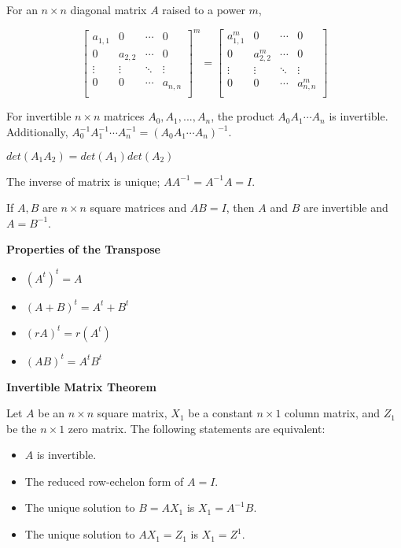 For an $n \times n$ diagonal matrix $A$ raised to a power $m$,

$$
\begin{bmatrix}
a_{1,1} & 0       & \cdots & 0     \\
0       & a_{2,2} & \cdots & 0     \\
\vdots  & \vdots  & \ddots & \vdots\\
0       & 0       & \cdots & a_{n,n}\\
\end{bmatrix}^{m}
=
\begin{bmatrix}
a_{1,1}^{m} & 0         & \cdots & 0        \\
0           & a_{2,2}^m & \cdots & 0        \\
\vdots      & \vdots    & \ddots & \vdots   \\
0           & 0         & \cdots & a_{n,n}^m\\
\end{bmatrix}$$


For invertible $n \times n$ matrices $A_0, A_1, ..., A_n$, the product $A_0A_1\cdots A_n$ is invertible. Additionally, $A_0^{-1}A_1^{-1}\cdots A_n^{-1}=(A_0A_1\cdots A_n)^{-1}$.

$det(A_{1}A_{2})=det(A_{1})det(A_{2})$

The inverse of matrix is unique; $AA^{-1}=A^{-1}A=I$.

If $A,B$ are $n \times n$ square matrices and $AB=I$, then $A$ and $B$ are invertible and $A=B^{-1}$.

\textbf{Properties of the Transpose}

\begin{itemize}
\item $(A^{t})^{t}=A$
\item $(A +B)^{t}=A^{t} + B^{t}$
\item $(rA)^{t}=r(A^{t})$
\item $(AB)^{t}=A^{t}B^{t}$
\end{itemize}

\textbf{Invertible Matrix Theorem}

Let $A$ be an $n\times n$ square matrix, $X_{1}$ be a constant $n\times 1$ column matrix, and $Z_{1}$ be the $n\times 1$ zero matrix. The following statements are equivalent:

\begin{itemize}
\item $A$ is invertible.
\item The reduced row-echelon form of $A=I$.
\item The unique solution to $B=AX_{1}$ is $X_{1}=A^{-1}B$.
\item The unique solution to $AX_{1}=Z_{1}$ is $X_{1}=Z^{1}$.
\end{itemize}

